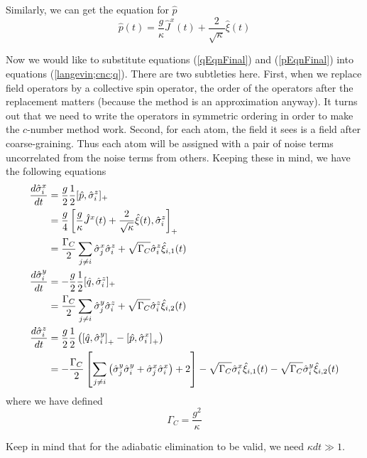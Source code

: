 \documentclass{article}
\newcommand{\gc}{\Gamma_C}
\begin{document}
Similarly, we can get the equation for $\hat{p}$
\begin{equation}
    \label{pEqnFinal}
    \hat{p}(t) = \frac{g}{\kappa}\hat{J}^x(t)+\frac{2}{\sqrt{\kappa}}\hat{\xi}(t)
\end{equation}

Now we would like to substitute equations (\ref{qEqnFinal}) and (\ref{pEqnFinal}) into equations (\ref{langevin;cnc;q}). There are two subtleties here. First, when we replace field operators by a collective spin operator, the order of the operators after the replacement matters (because the method is an approximation anyway). It turns out that we need to write the operators in symmetric ordering in order to make the $c$-number method work. Second, for each atom, the field it sees is a field after coarse-graining. Thus each atom will be assigned with a pair of noise terms uncorrelated from the noise terms from others. Keeping these in mind, we have the following equations
\begin{align}
    \label{xyz}
    \notag \frac{d \hat{\sigma}_i^x}{dt} &= \frac{g}{2}\frac{1}{2}[\hat{p},\hat{\sigma}^z_i]_+\\
    \notag &=\frac{g}{4}\left[\frac{g}{\kappa}\hat{J}^x(t)+\frac{2}{\sqrt{\kappa}}\hat{\xi}(t),\hat{\sigma}^z_i\right]_+\\
           &=\frac{\gc}{2}\sum_{j\neq i}\hat{\sigma}_j^x\hat{\sigma}^z_i+\sqrt{\gc}\hat{\sigma}^z_i\hat{\xi}_{i,1}(t)\\
    \notag \frac{d \hat{\sigma}_i^y}{dt} &= -\frac{g}{2}\frac{1}{2}[\hat{q},\hat{\sigma}^z_i]_+\\
           &=\frac{\gc}{2}\sum_{j\neq i}\hat{\sigma}_j^y\hat{\sigma}^z_i+\sqrt{\gc}\hat{\sigma}^z_i\hat{\xi}_{i,2}(t)\\
     \frac{d \hat{\sigma}_i^z}{dt} &=
    \notag\frac{g}{2}\frac{1}{2}\left(\left[\hat{q},\hat{\sigma}^y_i\right]_+-\left[\hat{p},\hat{\sigma}_i^x\right]_+\right)\\
           &=-\frac{\gc}{2}\left[\sum_{j\neq i}\left(\hat{\sigma}_j^y\hat{\sigma}^y_i+\hat{\sigma}_j^x\hat{\sigma}^x_i\right)+2\right]-\sqrt{\gc}\hat{\sigma}^x_i\hat{\xi}_{i,1}(t)-\sqrt{\gc}\hat{\sigma}^y_i\hat{\xi}_{i,2}(t)
\end{align}
where we have defined 
\begin{equation}
    \gc = \frac{g^2}{\kappa}
\end{equation}

Keep in mind that for the adiabatic elimination to be valid, we need $\kappa dt \gg 1$.
\end{document}
